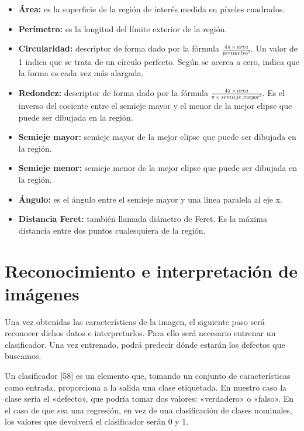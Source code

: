 \begin{itemize}

\item \textbf{Área:} es la superficie de la región de interés medida en píxeles cuadrados.

\item \textbf{Perímetro:} es la longitud del límite exterior de la región.

\item \textbf{Circularidad:} descriptor de forma dado por la fórmula $\frac{4\pi \times area}{perimetro^2}$. Un valor de 1 indica que se trata de un círculo perfecto. Según se acerca a cero, indica que la forma es cada vez más alargada.

\item \textbf{Redondez:} descriptor de forma dado por la fórmula $\frac{4\pi\times area}{\pi \times semieje\_mayor^2}$. Es el inverso del cociente entre el semieje mayor y el menor de la mejor elipse que puede ser dibujada en la región.

\item \textbf{Semieje mayor:} semieje mayor de la mejor elipse que puede ser dibujada en la región.

\item \textbf{Semieje menor:} semieje menor de la mejor elipse que puede ser dibujada en la región.

\item \textbf{Ángulo:} es el ángulo entre el semieje mayor y una línea paralela al eje x.

\item \textbf{Distancia Feret:} también llamada diámetro de Feret. Es la máxima distancia entre dos puntos cualesquiera de la región.

\end{itemize}




\section{Reconocimiento e interpretación de imágenes}
Una vez obtenidas las características de la imagen, el siguiente paso será reconocer dichos datos e interpretarlos. Para ello será necesario entrenar un clasificador. Una vez entrenado, podrá predecir dónde estarán los defectos que buscamos.

Un clasificador [58] es un elemento que, tomando un conjunto de características como entrada, proporciona a la salida una clase etiquetada. En nuestro caso la clase sería el «defecto», que podría tomar dos valores: «verdadero» o «falso». En el caso de que sea una regresión, en vez de una clasificación de clases nominales, los valores que devolverá el clasificador serán 0 y 1.

